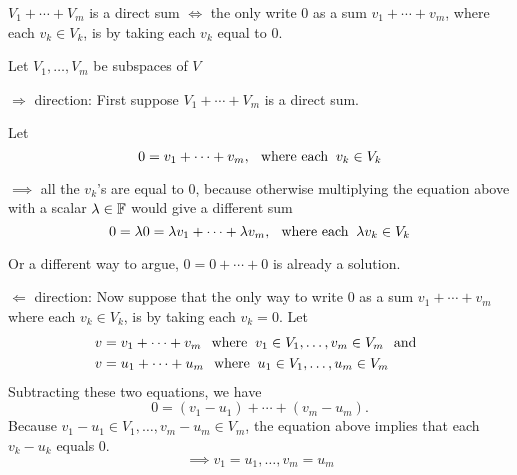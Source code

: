 \setcounter{thm}{44}
\begin{thm} 
  \label{condition-for-a-direct-sum}
  $V_1 + \cdots + V_m$ is a direct sum $\iff$ the only write $0$ as a sum $v_1 + \cdots + v_m$, where each $v_k \in V_k$, is by taking each $v_k$ equal to $0$.
\end{thm}
\begin{prf} Let  $V_1, \ldots, V_m$ be subspaces of $V$ 
  \begin{description}
    \item{$\Rightarrow$ direction:} First suppose $V_1 + \cdots + V_m$ is a direct sum. 
    
    Let
    \begin{equation}
      0 = v_1 + \cdots + v_m, \;\;\, \text{where each}\;\; v_k \in V_k
    \end{equation}
    
    $\implies$ all the $v_k$'s are equal to $0$, because otherwise multiplying the equation above with a scalar $\lambda \in \mathbb{F}$ would give a different sum
    \begin{equation}
      0 = \lambda0= \lambda v_1 + \cdots + \lambda v_m, \;\;\, \text{where each}\;\; \lambda v_k \in V_k
    \end{equation}
    
    Or a different way to argue, $0 = 0 + \cdots + 0$ is already a solution.

    \item{$\Leftarrow$ direction:} Now suppose that the only way to write $0$ as a sum $v_1 + \cdots + v_m$ where each $v_k \in V_k$, is by taking each $v_k = 0$. Let
    \begin{equation}
      \begin{aligned}
        v&=v_1 + \cdots + v_m \;\;\, \text{where}\;\; v_1 \in V_1, \ldots, v_m \in V_m \;\;\, \text{and}\;\; \\
        v&=u_1 + \cdots + u_m  \;\;\, \text{where}\;\; u_1 \in V_1, \ldots, u_m \in V_m
      \end{aligned}
    \end{equation}
    Subtracting these two equations, we have
    \begin{equation}
      0=(v_1-u_1)+\cdots+(v_m-u_m).
    \end{equation}
    Because $v_1 - u_1 \in V_1, \dots , v_m - u_m \in V_m$, the equation above implies that each $v_k -u_k$ equals $0$.
    \begin{equation}
      \implies v_1=u_1, \ldots, v_m=u_m
    \end{equation}
  \end{description}
\end{prf}

